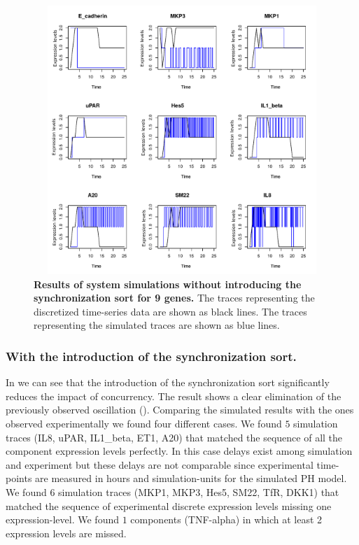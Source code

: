 \begin{figure}[H]
\centering
\includegraphics[width=5in,height=4in]{images/resultWOS.pdf}
\caption{{\bf Results of system simulations without introducing the synchronization sort for 9 genes.} The 
traces representing the discretized time-series data are shown as black lines.  The traces representing the simulated traces are shown as blue lines.}
\label{fig:rwos}
\end{figure}

\subsubsection{With the introduction of the synchronization sort.}
In  we can see that the introduction of the synchronization sort significantly reduces the 
impact of concurrency. The result shows  a 
clear elimination of the previously observed oscillation (). 
Comparing the simulated results with the ones observed experimentally we found four different cases.
We found $5$ simulation traces (IL8, uPAR, IL1\_beta, ET1, A20) that matched the sequence of all the component expression levels perfectly.  In this case delays exist among simulation and experiment but 
these delays are not comparable since experimental time-points are measured in hours and simulation-units for the simulated PH model.
We found $6$ simulation traces (MKP1, MKP3, Hes5, SM22, TfR, DKK1) that matched the sequence of experimental discrete expression levels missing one expression-level.
We found $1$ components (TNF-alpha) in which at least 2 expression levels are missed.


